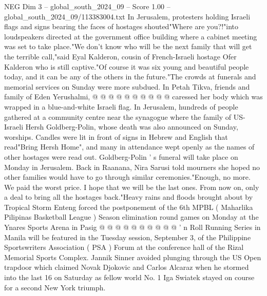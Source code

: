 \begin{textsample}{NEG Dim 3 – global\_south\_2024\_09 – Score 1.00 – global\_south\_2024\_09/113383004.txt}
In Jerusalem, protesters holding Israeli flags and signs bearing the faces of hostages shouted"Where are you?!"into loudspeakers directed at the government office building where a cabinet meeting was set to take place."We don't know who will be the next family that will get the terrible call,"said Eyal Kalderon, cousin of French-Israeli hostage Ofer Kalderon who is still captive."Of course it was six young and beautiful people today, and it can be any of the others in the future."The crowds at funerals and memorial services on Sunday were more subdued.
In Petah Tikva, friends and family of Eden Yerushalmi, @ @ @ @ @ @ @ @ @ @ caressed her body which was wrapped in a blue-and-white Israeli flag.
In Jerusalem, hundreds of people gathered at a community centre near the synagogue where the family of US-Israeli Hersh Goldberg-Polin, whose death was also announced on Sunday, worships.
Candles were lit in front of signs in Hebrew and English that read"Bring Hersh Home", and many in attendance wept openly as the names of other hostages were read out.
Goldberg-Polin ' s funeral will take place on Monday in Jerusalem.
Back in Raanana, Nira Sarusi told mourners she hoped no other families would have to go through similar ceremonies."Enough, no more.
We paid the worst price.
I hope that we will be the last ones.
From now on, only a deal to bring all the hostages back."Heavy rains and floods brought about by Tropical Storm Enteng forced the postponement of the 6th MPBL ( Maharlika Pilipinas Basketball League ) Season elimination round games on Monday at the Ynares Sports Arena in Pasig @ @ @ @ @ @ @ @ @ @ ' n Roll Running Series in Manila will be featured in the Tuesday session, September 3, of the Philippine Sportswriters Association ( PSA ) Forum at the conference hall of the Rizal Memorial Sports Complex.
Jannik Sinner avoided plunging through the US Open trapdoor which claimed Novak Djokovic and Carlos Alcaraz when he stormed into the last 16 on Saturday as fellow world No. 1 Iga Swiatek stayed on course for a second New York triumph.

\end{textsample}
